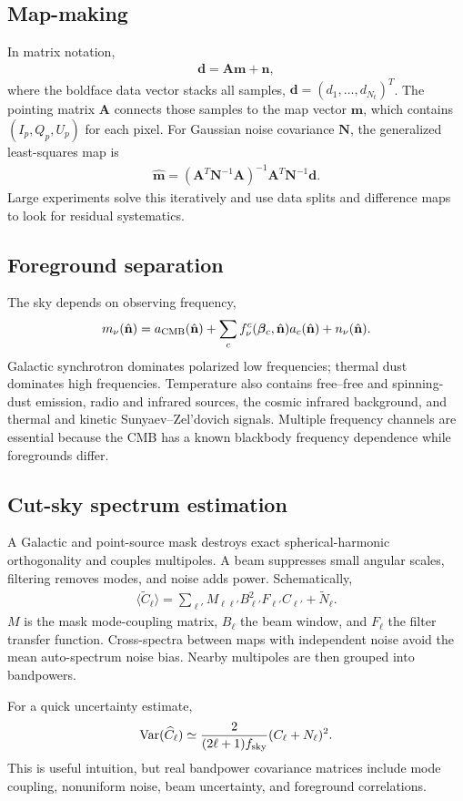 \documentclass[12pt]{article}
\newcommand{\be}{\begin{eqnarray}}
\newcommand{\ee}{\end{eqnarray}}
\newcommand{\bn}{\hat{\mathbf n}}
\begin{document}
\subsection{Map-making}
In matrix notation,
\be
\mathbf d=\mathbf A\mathbf m+\mathbf n,
\ee
where the boldface data vector stacks all samples,
$\mathbf d=(d_1,\ldots,d_{N_t})^T$. The pointing matrix $\mathbf A$ connects those
samples to the map vector $\mathbf m$, which contains $(I_p,Q_p,U_p)$ for each pixel.
For Gaussian noise covariance $\mathbf N$, the generalized least-squares map is
\be
\widehat{\mathbf m}=(\mathbf A^T\mathbf N^{-1}\mathbf A)^{-1}
\mathbf A^T\mathbf N^{-1}\mathbf d.
\ee
Large experiments solve this iteratively and use data splits and difference maps to
look for residual systematics.

\subsection{Foreground separation}
The sky depends on observing frequency,
\be
m_\nu(\bn)=a_{\rm CMB}(\bn)+\sum_c f_\nu^c(\bm\beta_c,\bn)a_c(\bn)+n_\nu(\bn).
\ee
Galactic synchrotron dominates polarized low frequencies; thermal dust dominates high
frequencies. Temperature also contains free--free and spinning-dust emission, radio
and infrared sources, the cosmic infrared background, and thermal and kinetic
Sunyaev--Zel'dovich signals. Multiple frequency channels are essential because the CMB
has a known blackbody frequency dependence while foregrounds differ.

\subsection{Cut-sky spectrum estimation}
A Galactic and point-source mask destroys exact spherical-harmonic orthogonality and
couples multipoles. A beam suppresses small angular scales, filtering removes modes,
and noise adds power. Schematically,
\be
\langle\widetilde C_\ell\rangle
=\sum_{\ell'}M_{\ell\ell'}B_{\ell'}^2F_{\ell'}C_{\ell'}
+\widetilde N_\ell.
\ee
$M$ is the mask mode-coupling matrix, $B_\ell$ the beam window, and $F_\ell$ the
filter transfer function. Cross-spectra between maps with independent noise avoid the
mean auto-spectrum noise bias. Nearby multipoles are then grouped into bandpowers.

For a quick uncertainty estimate,
\be
\operatorname{Var}(\widehat C_\ell)\simeq
\frac{2}{(2\ell+1)f_{\rm sky}}(C_\ell+N_\ell)^2.
\ee
This is useful intuition, but real bandpower covariance matrices include mode coupling,
nonuniform noise, beam uncertainty, and foreground correlations.
\end{document}
